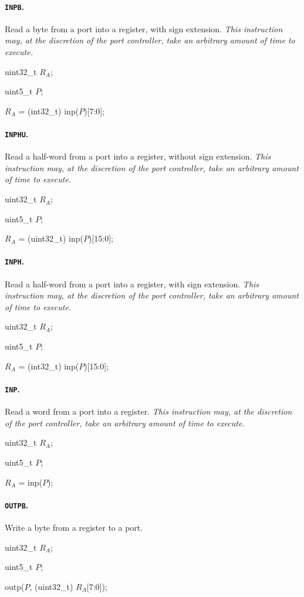 \documentclass[12pt,english,twoside]{report}
\def\code{\texttt}
\def\subsubsubsection{\paragraph}
\newcommand\incomplete[1]{{\color{red}\it #1}}
\newenvironment{codeblock}
{\begin{list}{}{
\setlength{\rightmargin}{\leftmargin}
\setlength{\listparindent}{0pt}%
\raggedright
\setlength{\itemsep}{0pt}
\setlength{\parsep}{0pt}
\normalfont\ttfamily}%
 \item[]}
{\end{list}}
\begin{document}
\subsubsubsection{\label{sec:Ins_INPB}\code{INPB}.}
Read a byte from a port into a register, with sign extension.
\incomplete{This instruction may, at the discretion of the port
  controller, take an arbitrary amount of time to execute.}

\begin{codeblock}
  uint32\_t $R_A$;
  
  uint5\_t $P$;

  $R_A$ = (int32\_t) inp($P$)[7:0];
\end{codeblock}

\subsubsubsection{\label{sec:Ins_INPHU}\code{INPHU}.}
Read a half-word from a port into a register, without sign extension.
\incomplete{This instruction may, at the discretion of the port
  controller, take an arbitrary amount of time to execute.}

\begin{codeblock}
  uint32\_t $R_A$;
  
  uint5\_t $P$;

  $R_A$ = (uint32\_t) inp($P$)[15:0];
\end{codeblock}

\subsubsubsection{\label{sec:Ins_INPH}\code{INPH}.}
Read a half-word from a port into a register, with sign extension.
\incomplete{This instruction may, at the discretion of the port
  controller, take an arbitrary amount of time to execute.}

\begin{codeblock}
  uint32\_t $R_A$;
  
  uint5\_t $P$;

  $R_A$ = (int32\_t) inp($P$)[15:0];
\end{codeblock}

\subsubsubsection{\label{sec:Ins_INP}\code{INP}.}
Read a word from a port into a register.
\incomplete{This instruction may, at the discretion of the port
  controller, take an arbitrary amount of time to execute.}

\begin{codeblock}
  uint32\_t $R_A$;
  
  uint5\_t $P$;

  $R_A$ = inp($P$);
\end{codeblock}

\subsubsubsection{\label{sec:Ins_OUTPB}\code{OUTPB}.}
Write a byte from a register to a port.

\begin{codeblock}
  uint32\_t $R_A$;

  uint5\_t $P$;

  outp($P$, (uint32\_t) $R_A$[7:0]);
\end{codeblock}
\end{document}
